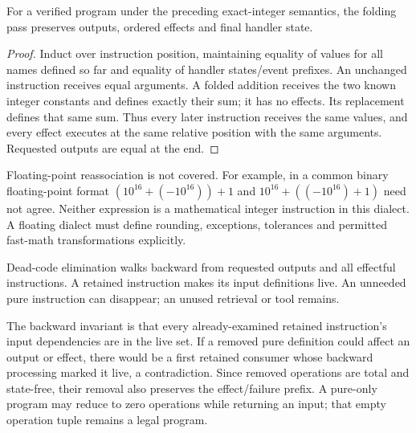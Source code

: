 \par\medskip\noindent\begin{minipage}{\linewidth}
\begin{proposition}
For a verified program under the preceding exact-integer semantics, the folding
pass preserves outputs, ordered effects and final handler state.
\end{proposition}
\begin{proof}
Induct over instruction position, maintaining equality of values for all names
defined so far and equality of handler states/event prefixes. An unchanged
instruction receives equal arguments. A folded addition receives the two
known integer constants and defines exactly their sum; it has no effects.
Its replacement defines that same sum. Thus every later instruction receives
the same values, and every effect executes at the same relative position
with the same arguments. Requested outputs are equal at the end.
\end{proof}
\end{minipage}\par\medskip
Floating-point reassociation is not covered. For example, in a common binary
floating-point format $(10^{16}+(-10^{16}))+1$ and
$10^{16}+((-10^{16})+1)$ need not agree. Neither expression is a mathematical
integer instruction in this dialect. A floating dialect must define rounding,
exceptions, tolerances and permitted fast-math transformations explicitly.

Dead-code elimination walks backward from requested outputs and all effectful
instructions. A retained instruction makes its input definitions live. An
unneeded pure instruction can disappear; an unused retrieval or tool remains.

The backward invariant is that every already-examined retained instruction's
input dependencies are in the live set. If a removed pure definition could
affect an output or effect, there would be a first retained consumer whose
backward processing marked it live, a contradiction. Since removed operations
are total and state-free, their removal also preserves the effect/failure
prefix. A pure-only program may reduce to zero operations while returning an
input; that empty operation tuple remains a legal program.


